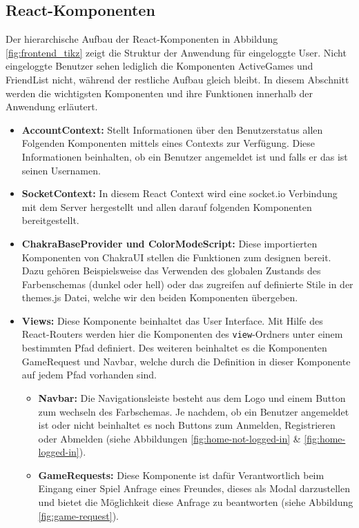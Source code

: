 \documentclass[a4paper,12pt]{report}
\begin{document}
        \subsection{React-Komponenten}
Der hierarchische Aufbau der React-Komponenten in Abbildung \ref{fig:frontend_tikz} zeigt die Struktur der Anwendung für eingeloggte User. Nicht eingeloggte Benutzer sehen lediglich die Komponenten ActiveGames und FriendList nicht, während der restliche Aufbau gleich bleibt. In diesem Abschnitt werden die wichtigsten Komponenten und ihre Funktionen innerhalb der Anwendung erläutert.
        
\begin{itemize}
\item \textbf{AccountContext:} Stellt Informationen über den Benutzerstatus allen Folgenden Komponenten mittels eines Contexts zur Verfügung. Diese Informationen beinhalten, ob ein Benutzer angemeldet ist und falls er das ist seinen Usernamen.
\item \textbf{SocketContext:} In diesem React Context wird eine socket.io Verbindung mit dem Server hergestellt und allen darauf folgenden Komponenten bereitgestellt.
\item \textbf{ChakraBaseProvider und ColorModeScript:} Diese importierten Komponenten von ChakraUI stellen die Funktionen zum designen bereit. Dazu gehören Beispielsweise das Verwenden des globalen Zustands des Farbenschemas (dunkel oder hell) oder das zugreifen auf definierte Stile in der themes.js Datei, welche wir den beiden Komponenten übergeben.
\item \textbf{Views:} Diese Komponente beinhaltet das User Interface. Mit Hilfe des React-Routers werden hier die Komponenten des \verb|view|-Ordners unter einem bestimmten Pfad definiert. Des weiteren beinhaltet es die Komponenten GameRequest und Navbar, welche durch die Definition in dieser Komponente auf jedem Pfad vorhanden sind.
\begin{itemize}
\item \textbf{Navbar:} Die Navigationsleiste besteht aus dem Logo und einem Button zum wechseln des Farbschemas. Je nachdem, ob ein Benutzer angemeldet ist oder nicht beinhaltet es noch Buttons zum Anmelden, Registrieren oder Abmelden (siehe Abbildungen \ref{fig:home-not-logged-in} \& \ref{fig:home-logged-in}).
\item \textbf{GameRequests:} Diese Komponente ist dafür Verantwortlich beim Eingang einer Spiel Anfrage eines Freundes, dieses als Modal darzustellen und bietet die Möglichkeit diese Anfrage zu beantworten (siehe Abbildung \ref{fig:game-request}).

\end{itemize}
\end{itemize}
\end{document}
